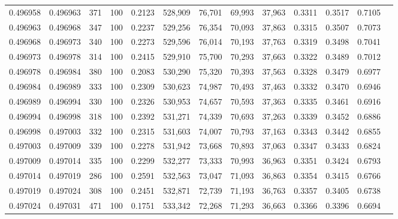 \begin{tabular}{rrrrrrrrrrrrr}
0.496958 & 0.496963 &   371 & 100 &                                     0.2123 & 528,909 &  76,701 &  69,993 &  37,963 & 0.3311 & 0.3517 & 0.7105 \\
0.496963 & 0.496968 &   347 & 100 &                                     0.2237 & 529,256 &  76,354 &  70,093 &  37,863 & 0.3315 & 0.3507 & 0.7073 \\
0.496968 & 0.496973 &   340 & 100 &                                     0.2273 & 529,596 &  76,014 &  70,193 &  37,763 & 0.3319 & 0.3498 & 0.7041 \\
0.496973 & 0.496978 &   314 & 100 &                                     0.2415 & 529,910 &  75,700 &  70,293 &  37,663 & 0.3322 & 0.3489 & 0.7012 \\
0.496978 & 0.496984 &   380 & 100 &                                     0.2083 & 530,290 &  75,320 &  70,393 &  37,563 & 0.3328 & 0.3479 & 0.6977 \\
0.496984 & 0.496989 &   333 & 100 &                                     0.2309 & 530,623 &  74,987 &  70,493 &  37,463 & 0.3332 & 0.3470 & 0.6946 \\
0.496989 & 0.496994 &   330 & 100 &                                     0.2326 & 530,953 &  74,657 &  70,593 &  37,363 & 0.3335 & 0.3461 & 0.6916 \\
0.496994 & 0.496998 &   318 & 100 &                                     0.2392 & 531,271 &  74,339 &  70,693 &  37,263 & 0.3339 & 0.3452 & 0.6886 \\
0.496998 & 0.497003 &   332 & 100 &                                     0.2315 & 531,603 &  74,007 &  70,793 &  37,163 & 0.3343 & 0.3442 & 0.6855 \\
0.497003 & 0.497009 &   339 & 100 &                                     0.2278 & 531,942 &  73,668 &  70,893 &  37,063 & 0.3347 & 0.3433 & 0.6824 \\
0.497009 & 0.497014 &   335 & 100 &                                     0.2299 & 532,277 &  73,333 &  70,993 &  36,963 & 0.3351 & 0.3424 & 0.6793 \\
0.497014 & 0.497019 &   286 & 100 &                                     0.2591 & 532,563 &  73,047 &  71,093 &  36,863 & 0.3354 & 0.3415 & 0.6766 \\
0.497019 & 0.497024 &   308 & 100 &                                     0.2451 & 532,871 &  72,739 &  71,193 &  36,763 & 0.3357 & 0.3405 & 0.6738 \\
0.497024 & 0.497031 &   471 & 100 &                                     0.1751 & 533,342 &  72,268 &  71,293 &  36,663 & 0.3366 & 0.3396 & 0.6694 \\

\end{tabular}
